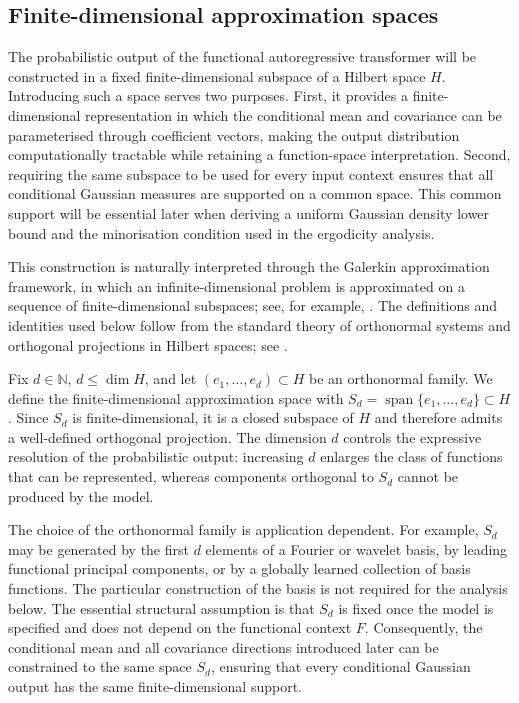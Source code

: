 \subsection{Finite-dimensional approximation spaces}\label{subsec:Finite-dimensional approximation spaces}
The probabilistic output of the functional autoregressive transformer will be constructed in a fixed finite-dimensional subspace of a Hilbert space \(H\). Introducing such a space serves two purposes. First, it provides a finite-dimensional representation in which the conditional mean and covariance can be parameterised through coefficient vectors, making the output distribution computationally tractable while retaining a function-space interpretation. Second, requiring the same subspace to be used for every input context ensures that all conditional Gaussian measures are supported on a common space. This common support will be essential later when deriving a uniform Gaussian density lower bound and the minorisation condition used in the ergodicity analysis.

This construction is naturally interpreted through the Galerkin approximation framework, in which an infinite-dimensional problem is approximated on a sequence of finite-dimensional subspaces; see, for example, \cite{QuarteroniValli1994}. The definitions and identities used below follow from the standard theory of orthonormal systems and orthogonal projections in Hilbert spaces; see \cite[Chapter~5]{Brezis2011}.

Fix \(d\in\mathbb N\), \(d\leqslant\dim H\), and let \((e_1,\ldots,e_d)\subset H\) be an orthonormal family. We define the finite-dimensional approximation space with \(S_d=\operatorname{span}\{e_1,\ldots,e_d\}\subset H\).
Since \(S_d\) is finite-dimensional, it is a closed subspace of \(H\) and therefore admits a well-defined orthogonal projection. The dimension \(d\) controls the expressive resolution of the probabilistic output: increasing \(d\) enlarges the class of functions that can be represented, whereas components orthogonal to \(S_d\) cannot be produced by the model.

The choice of the orthonormal family is application dependent. For example, \(S_d\) may be generated by the first \(d\) elements of a Fourier or wavelet basis, by leading functional principal components, or by a globally learned collection of basis functions. The particular construction of the basis is not required for the analysis below. The essential structural assumption is that \(S_d\) is fixed once the model is specified and does not depend on the functional context \(F\). Consequently, the conditional mean and all covariance directions introduced later can be constrained to the same space \(S_d\), ensuring that every conditional Gaussian output has the same finite-dimensional support.

